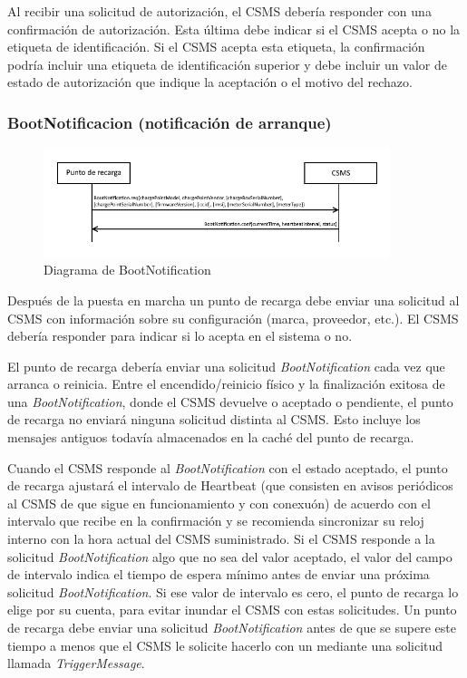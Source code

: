 \documentclass[12pt,a4paper,onecolumn,oneside]{report}
\begin{document}
Al recibir una solicitud de autorización, el CSMS debería responder con una confirmación de autorización. Esta última debe indicar si el CSMS acepta o no la etiqueta de identificación. Si el CSMS acepta esta etiqueta, la confirmación podría incluir una etiqueta de identificación superior y debe incluir un valor de estado de autorización que indique la aceptación o el motivo del rechazo.


\subsubsection{BootNotificacion (notificación de arranque)}
\label{BootNotificacion (notificación de arranque)}


\begin{figure}[h] 
\centering
  \includegraphics[width=0.9\textwidth]{figuras/diagramabootnotification.png}
  \caption[Diagrama de \textit{BootNotification}]{Diagrama de BootNotification\\
  }
  \label{fig:diagramabootnotification}
\end{figure}


Después de la puesta en marcha un punto de recarga debe enviar una solicitud al CSMS con información sobre su configuración (marca, proveedor, etc.). El CSMS debería responder para indicar si lo acepta en el sistema o no.

El punto de recarga debería enviar una solicitud \textit{BootNotification} cada vez que arranca o reinicia. Entre el encendido/reinicio físico y la finalización exitosa de una \textit{BootNotification}, donde el CSMS devuelve o aceptado o pendiente, el punto de recarga no enviará ninguna solicitud distinta al CSMS. Esto incluye los mensajes antiguos todavía almacenados en la caché del punto de recarga.

Cuando el CSMS responde al \textit{BootNotification} con el estado aceptado, el punto de recarga ajustará el intervalo de Heartbeat (que consisten en avisos periódicos al CSMS de que sigue en funcionamiento y con conexuón) de acuerdo con el intervalo que recibe en la confirmación y se recomienda sincronizar su reloj interno con la hora actual del CSMS suministrado. Si el CSMS responde a la solicitud \textit{BootNotification} algo que no sea del valor aceptado, el valor del campo de intervalo indica el tiempo de espera mínimo antes de enviar una próxima solicitud \textit{BootNotification}. Si ese valor de intervalo es cero, el punto de recarga lo elige por su cuenta, para evitar inundar el CSMS con estas solicitudes. Un punto de recarga debe enviar una solicitud \textit{BootNotification} antes de que se supere este tiempo a menos que el CSMS le solicite hacerlo con un mediante una solicitud llamada \textit{TriggerMessage}.
\end{document}
